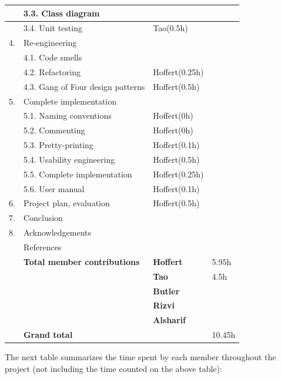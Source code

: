 \documentclass[12pt,a4paper]{article}
\begin{document}
\begin{longtable}{| p{0.2cm} p{6.25cm} | p{3cm}| p{5cm} |}
   & 3.3. Class diagram &  &  \\ \hline
   & 3.4. Unit testing & Tao(0.5h) &  \\ \hline
  4. & Re-engineering &  &  \\ \hline
   & 4.1. Code smells &  &  \\ \hline
   & 4.2. Refactoring & Hoffert(0.25h) &  \\ \hline
   & 4.3. Gang of Four design patterns & Hoffert(0.5h) &  \\ \hline
  5. & Complete implementation &  &  \\ \hline
   & 5.1. Naming conventions & Hoffert(0h) &  \\ \hline
   & 5.2. Commenting & Hoffert(0h) &  \\ \hline
   & 5.3. Pretty-printing & Hoffert(0.1h) &  \\ \hline
   & 5.4. Usability engineering & Hoffert(0.5h) &  \\ \hline
   & 5.5. Complete implementation & Hoffert(0.25h) &  \\ \hline
   & 5.6. User manual & Hoffert(0.1h) &  \\ \hline
  6. & Project plan, evaluation & Hoffert(0.5h) &  \\ \hline
  7. & Conclusion &  &  \\ \hline
  8. & Acknowledgements &  &  \\ \hline
   & References &  &  \\ \hline
    & \textbf{Total member contributions} & \textbf{Hoffert} & 5.95h \\ \cline{3-4}
    &  & \textbf{Tao} & 4.5h \\ \cline{3-4}
    &  & \textbf{Butler} & \\ \cline{3-4}
    &  & \textbf{Rizvi} & \\ \cline{3-4}
    &  & \textbf{Alsharif} & \\ \hline
    & \textbf{Grand total} &  & 10.45h \\ \hline
\end{longtable}

The next table summarizes the time spent by each member throughout the project (not including the time counted on the above table):
\end{document}
